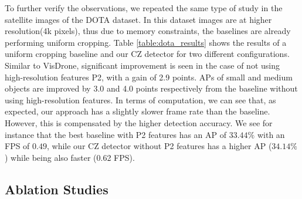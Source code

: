 To further verify the observations, we repeated the same type of study in the satellite images of the DOTA dataset. In this dataset images are at higher resolution(4k pixels), thus due to memory constraints, the baselines are already performing uniform cropping. Table \ref{table:dota_results} shows the results of a uniform cropping baseline and our CZ detector for two different configurations. Similar to VisDrone, significant improvement is seen in the case of not using high-resolution features P2, with a gain of 2.9 points. APs of small and medium objects are improved by 3.0 and 4.0 points respectively from the baseline without using high-resolution features. In terms of computation, we can see that, as expected, our approach has a slightly slower frame rate than the baseline. However, this is compensated by the higher detection accuracy. We see for instance that the best baseline with P2 features has an AP of $33.44\%$ with an FPS of $0.49$, while our CZ detector without P2 features has a higher AP ($34.14\%$) while being also faster (0.62 FPS).
\begin{table}
    \centering
    \caption{Performance comparison of our method against baselines on DOTA dataset (4K pixel resolution).}
    \label{table:dota_results}
\end{table}

\subsection{Ablation Studies}



